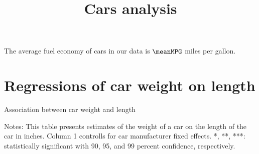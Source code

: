 \documentclass[english]{article}
\date{}
\begin{document}
\title{Cars analysis}

\maketitle

The average fuel economy of cars in our data is $\meanMPG$ miles
per gallon.

\section{Regressions of car weight on length}

\begin{table}[H]
\caption{Association between car weight and length\textbf{\label{tab:AssocWeightLength}}}
\begin{centering}

\par
\end{centering}
\medskip{}
{\small{}Notes: This table presents estimates of the weight of a car on the length of the car in inches. Column 1 controlls for car manufacturer fixed effects. *, **, ***: statistically significant with 90, 95, and 99 percent confidence, respectively.}
\end{table}
\end{document}
